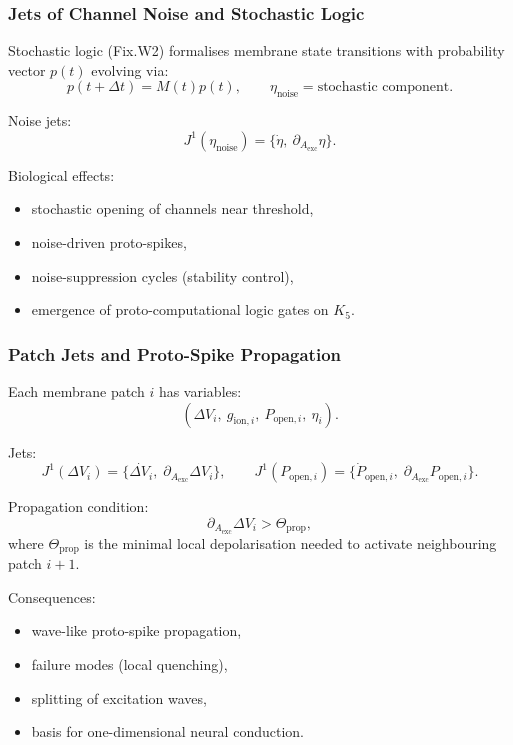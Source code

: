 \subsubsection{Jets of Channel Noise and Stochastic Logic}

Stochastic logic (Fix.W2) formalises membrane state transitions with
probability vector $p(t)$ evolving via:
\[
p(t+\Delta t)=M(t)p(t),\qquad
\eta_{\mathrm{noise}}=\text{stochastic component}.
\]

Noise jets:
\[
J^1(\eta_{\mathrm{noise}})=
\{\dot{\eta},\ \partial_{A_{\mathrm{exc}}}\eta\}.
\]

Biological effects:

\begin{itemize}
    \item stochastic opening of channels near threshold,
    \item noise-driven proto-spikes,
    \item noise-suppression cycles (stability control),
    \item emergence of proto-computational logic gates on $K_5$.
\end{itemize}


\subsubsection{Patch Jets and Proto-Spike Propagation}

Each membrane patch $i$ has variables:
\[
(\Delta V_i,\ g_{\mathrm{ion},i},\ P_{\mathrm{open},i},\ \eta_i).
\]

Jets:
\[
J^1(\Delta V_i)=\{\dot{\Delta V_i},\;\partial_{A_{\mathrm{exc}}}\Delta V_i\},
\qquad
J^1(P_{\mathrm{open},i})=\{\dot{P}_{\mathrm{open},i},\;
\partial_{A_{\mathrm{exc}}}P_{\mathrm{open},i}\}.
\]

Propagation condition:
\[
\partial_{A_{\mathrm{exc}}}\Delta V_{i} > \Theta_{\mathrm{prop}},
\]
where $\Theta_{\mathrm{prop}}$ is the minimal local depolarisation needed
to activate neighbouring patch $i+1$.

Consequences:

\begin{itemize}
    \item wave-like proto-spike propagation,
    \item failure modes (local quenching),
    \item splitting of excitation waves,
    \item basis for one-dimensional neural conduction.
\end{itemize}


